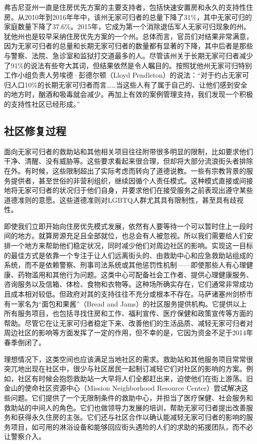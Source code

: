 \documentclass[fontset=fandol, a4paper, 12pt, openright]{ctexbook}
\begin{document}
弗吉尼亚州一直是住房优先方案的主要支持者，包括快速安置房和永久的支持性住房。从2010年到2016年年中，该州无家可归者的总量下降了31\%，其中无家可归的家庭数量下降了37.6\%。2015年，它成为第一个消除退伍军人无家可归现象的州。犹他州也是较早采纳住房优先方案的一个州。总体而言，官员们对结果非常满意，因为无家可归者的总量和长期无家可归者的数量都有显著的下降，其中后者是那些与警察、法院、急诊室和监狱打交道最多的人。尽管该州关于长期无家可归者减少了91\%的说法有些夸大其词，但结果依然是令人瞩目的。按照犹他州无家可归特别工作小组负责人劳埃德·彭德尔顿（Lloyd Pendleton）的说法：“对于约占无家可归人口10\%的长期无家可归者而言……当这些人有了属于自己的、让他们感到安全的地方时，酗酒和吸毒就会减少。再加上有效的案例管理支持，我们发现一个积极的支持性社区已经形成。”

\subsection{社区修复过程}
面向无家可归者的救助站和其他相关项目往往附带很多明显的限制，比如要求他们干净、清醒、没有威胁等。这些要求看起来很合理，但却将大部分流浪街头者排除在外。有时候，这些限制超出了实际考虑而转向了道德说教。一些有宗教背景的服务提供者，甚至世俗的非营利组织，继续因循个人责任模式。这种模式直接或间接地将无家可归者的状况归于他们自身，并要求他们在接受服务之前表现出遵守某些道德准则的意愿。这些道德准则对LGBTQ人群尤其具有限制性，甚至具有歧视性。

即使我们立即开始向住房优先模式发展，依然有人要等待一个可以暂时住上一段时间的地方。就算房源充足且全部就位，也总会有人被忽视。所以我们需要给人们安排一个地方来帮助他们稳定状况，同时减少他们对周边社区的影响。实现这一目标的最佳方式是依靠一个专注于让人们远离街头的、由救助中心和应急救助站组成的系统，而不是依赖警察、刑事司法系统或其他惩罚性机制——即使那些人有心理健康、药物滥用和其他行为问题。这类中心可配备社会工作者、提供心理健康服务、咨询服务以及信箱、体检、食物和衣物等。这种场所确实存在，它们通常非常成功且成本相对较低。但政府对其的支持往往不充分或根本不存在。马萨诸塞州剑桥市有一家名为“面包和果酱”（Bread and Jams）的社区服务提供机构。它提供以上所有服务项目，也包括寻找住房和工作、福利宣传、医疗保健和政策宣传等方面的帮助。尽管它在让无家可归者稳定下来、改善他们的生活品质、减轻无家可归者对周边社区的影响等方面发挥了一定的作用，但不幸的是，它因为资金不足于2014年春季倒闭了。

理想情况下，这类空间也应该满足当地社区的需求。救助站和其他服务项目常常很突兀地出现在社区中，很少与社区居民一起制订减轻它们对社区的影响的方案。例如，社区有时候会抱怨救助站一大早将人们全都赶出来，迫使他们在街上游荡。旧金山的使命社区资源中心（Mission Neighborhood Resource Center）尝试解决这些问题。它们提供了一个无限制条件的救助中心，并担当了医疗保健、社会服务和救助站的中间人的角色。它们也做领导力发展的培训，帮助无家可归者提出改善服务和获得永久住房的主张。它们还与社区合作以确认能减轻无家可归者的影响的服务项目，如可用的淋浴设备和能够回应街头遇险的人们的求助的拓援团队，而不必让警察介入。
\end{document}
